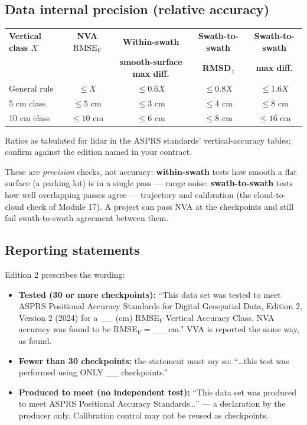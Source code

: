 \subsection{Data internal precision (relative accuracy)}
\begin{center}\small
\renewcommand{\arraystretch}{1.2}
\begin{tabular}{lcccc}\toprule
\textbf{Vertical class $X$} & \textbf{NVA $\text{RMSE}_V$} & \textbf{Within-swath} & \textbf{Swath-to-swath} & \textbf{Swath-to-swath}\\
 & & \textbf{smooth-surface max diff.} & \textbf{RMSD$_z$} & \textbf{max diff.}\\\midrule
General rule & $\le X$ & $\le0.6X$ & $\le0.8X$ & $\le1.6X$\\
5 cm class & $\le5$ cm & $\le3$ cm & $\le4$ cm & $\le8$ cm\\
10 cm class & $\le10$ cm & $\le6$ cm & $\le8$ cm & $\le16$ cm\\\bottomrule
\end{tabular}\end{center}
{\footnotesize Ratios as tabulated for lidar in the ASPRS standards' vertical-accuracy tables; confirm against the edition named in your contract.}

These are \emph{precision} checks, not accuracy: \textbf{within-swath} tests how smooth a flat surface (a parking lot) is in a single pass --- range noise; \textbf{swath-to-swath} tests how well overlapping passes agree --- trajectory and calibration (the cloud-to-cloud check of Module 17). A project can pass NVA at the checkpoints and still fail swath-to-swath agreement between them.

\subsection{Reporting statements}
\begin{eng}
Edition 2 prescribes the wording:
\begin{itemize}
\item \textbf{Tested (30 or more checkpoints):} ``This data set was tested to meet ASPRS Positional Accuracy Standards for Digital Geospatial Data, Edition 2, Version 2 (2024) for a \_\_ (cm) RMSE$_V$ Vertical Accuracy Class. NVA accuracy was found to be RMSE$_V$ = \_\_ cm.'' VVA is reported the same way, as found.
\item \textbf{Fewer than 30 checkpoints:} the statement must say so: ``\ldots this test was performed using ONLY \_\_ checkpoints.''
\item \textbf{Produced to meet (no independent test):} ``This data set was produced to meet ASPRS Positional Accuracy Standards\ldots'' --- a declaration by the producer only. Calibration control may not be reused as checkpoints.
\end{itemize}
\end{eng}

